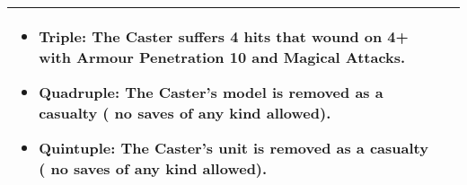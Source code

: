 \begin{tabular}{>{\bfseries}M{0.055\textwidth} m{0.88\textwidth}}
\begin{itemize}
\item \textbf{Triple:} The Caster suffers 4 hits that wound on 4+ with Armour Penetration 10 and Magical Attacks.
\item \textbf{Quadruple:} The Caster's model is removed as a casualty ( no saves of any kind allowed).
\item \textbf{Quintuple:} The Caster's unit is removed as a casualty ( no saves of any kind allowed).
\end{itemize}
\tabularnewline[-10pt]
\hline
\end{tabular}






